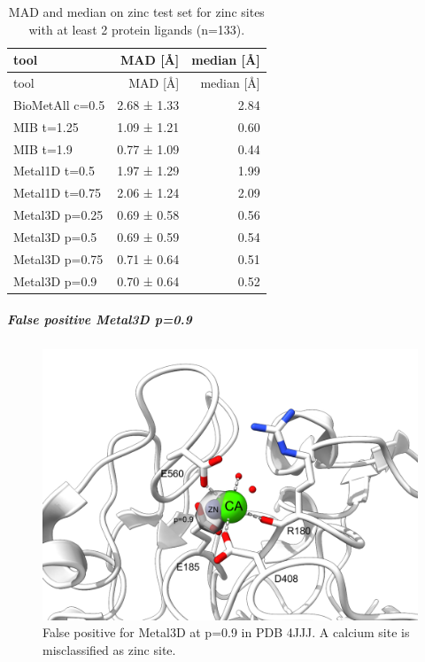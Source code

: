 \documentclass[  ASAPversion,
  ,
  9pt]{elife}
\newenvironment{fignos:tagged-figure}[1][]{
  \let\oldthefigure\thefigure
  \let\oldtheHfigure\theHfigure
  \renewcommand{\thefigure}{#1}
  \renewcommand{\theHfigure}{#1}
}{
  \let\thefigure\oldthefigure
  \let\theHfigure\oldtheHfigure
  \addtocounter{figure}{-1}
}
\newenvironment{tablenos:tagged-table}[1][]{
  \let\oldthetable\thetable
  \let\oldtheHtable\theHtable
  \renewcommand{\thetable}{#1}
  \renewcommand{\theHtable}{#1}
}{
  \let\thetable\oldthetable
  \let\theHtable\oldtheHtable
  \addtocounter{table}{-1}
}
\begin{document}
\begin{tablenos:tagged-table}[S4]

\begin{longtable}[]{@{}lrr@{}}
\caption{MAD and median on zinc test set for zinc sites with at least 2 protein ligands (n=133). \label{tbl:compmadmediantestgoodonly}}\tabularnewline
\toprule
tool & MAD {[}Å{]} & median {[}Å{]}\tabularnewline
\midrule
\endfirsthead
\toprule
tool & MAD {[}Å{]} & median {[}Å{]}\tabularnewline
\midrule
\endhead
BioMetAll c=0.5 & 2.68 ± 1.33 & 2.84\tabularnewline
MIB t=1.25 & 1.09 ± 1.21 & 0.60\tabularnewline
MIB t=1.9 & 0.77 ± 1.09 & 0.44\tabularnewline
Metal1D t=0.5 & 1.97 ± 1.29 & 1.99\tabularnewline
Metal1D t=0.75 & 2.06 ± 1.24 & 2.09\tabularnewline
Metal3D p=0.25 & 0.69 ± 0.58 & 0.56\tabularnewline
Metal3D p=0.5 & 0.69 ± 0.59 & 0.54\tabularnewline
Metal3D p=0.75 & 0.71 ± 0.64 & 0.51\tabularnewline
Metal3D p=0.9 & 0.70 ± 0.64 & 0.52\tabularnewline
\bottomrule
\end{longtable}

\end{tablenos:tagged-table}

\hypertarget{false-positive-metal3d-p0.9}{%
\subparagraph{False positive Metal3D p=0.9}\label{false-positive-metal3d-p0.9}}

\begin{fignos:tagged-figure}[S8]

\begin{figure}
\hypertarget{fig:4jjjFP}{%
\centering
\includegraphics{images/4JJJ_FalsePositive_p=0.9_annotated.png}
\caption{False positive for Metal3D at p=0.9 in PDB 4JJJ. A calcium site is misclassified as zinc site.}\label{fig:4jjjFP}
}
\end{figure}

\end{fignos:tagged-figure}
\end{document}
